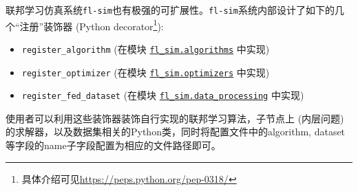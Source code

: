 联邦学习仿真系统\texttt{fl-sim}也有极强的可扩展性。\texttt{fl-sim}系统内部设计了如下的几个``注册''装饰器 (Python decorator\footnote{具体介绍可见\url{https://peps.python.org/pep-0318/}}):
\begin{itemize}
    \item \verb|register_algorithm| (在模块 \href{https://github.com/wenh06/fl-sim/blob/master/fl_sim/algorithms/_register.py}{\texttt{fl\_sim.algorithms}} 中实现)
    \item \verb|register_optimizer| (在模块 \href{https://github.com/wenh06/fl-sim/blob/master/fl_sim/optimizers/_register.py}{\texttt{fl\_sim.optimizers}} 中实现)
    \item \verb|register_fed_dataset| (在模块 \href{https://github.com/wenh06/fl-sim/blob/master/fl_sim/data_processing/_register.py}{\texttt{fl\_sim.data\_processing}} 中实现)
\end{itemize}
使用者可以利用这些装饰器装饰自行实现的联邦学习算法，子节点上 (内层问题) 的求解器，以及数据集相关的Python类，同时将配置文件中的algorithm, dataset等字段的name子字段配置为相应的文件路径即可。
